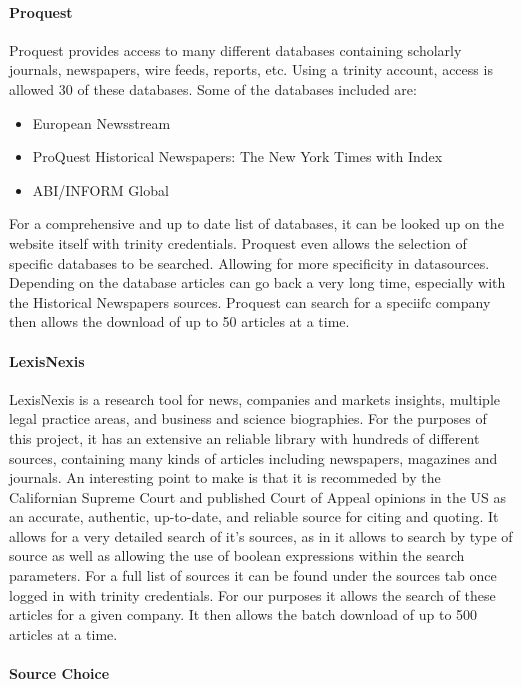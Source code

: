 \paragraph{Proquest}

Proquest provides access to many different databases containing scholarly journals, newspapers, wire feeds, reports, etc. Using a trinity account, access is allowed 30 of these databases. Some of the databases included are:
\begin{itemize}
    \item European Newsstream
    \item ProQuest Historical Newspapers: The New York Times with Index
    \item ABI/INFORM Global‎
\end{itemize}
For a comprehensive and up to date list of databases, it can be looked up on the website itself with trinity credentials. Proquest even allows the selection of specific databases to be searched. Allowing for more specificity in datasources. Depending on the database articles can go back a very long time, especially with the Historical Newspapers sources. Proquest can search for a speciifc company then allows the download of up to 50 articles at a time.

\paragraph{LexisNexis}

LexisNexis is a research tool for news, companies and markets insights, multiple legal practice areas, and business and science biographies. For the purposes of this project, it has an extensive an reliable library with hundreds of different sources, containing many kinds of articles including newspapers, magazines and journals. An interesting point to make is that it is recommeded by the Californian Supreme Court and published Court of Appeal opinions in the US as an accurate, authentic, up-to-date, and reliable source for citing and quoting. It allows for a very detailed search of it's sources, as in it allows to search by type of source as well as allowing the use of boolean expressions within the search parameters. For a full list of sources it can be found under the sources tab once logged in with trinity credentials. For our purposes it allows the search of these articles for a given company. It then allows the batch download of up to 500 articles at a time.

\paragraph{Source Choice}

